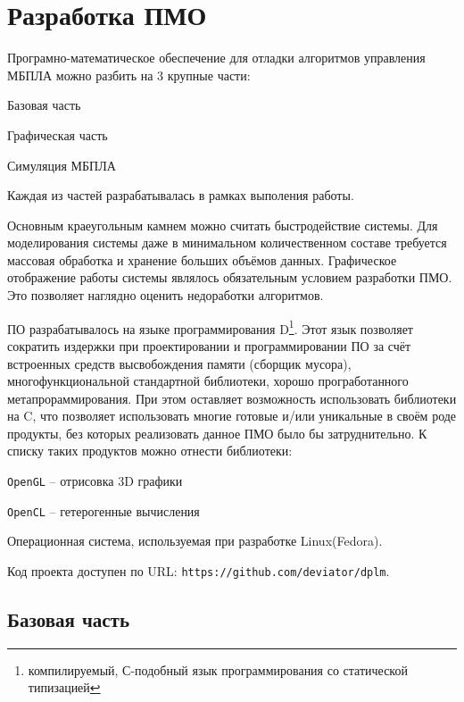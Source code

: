\section{Разработка ПМО}

Програмно-математическое обеспечение для отладки алгоритмов управления
\linebreak МБПЛА можно разбить на 3 крупные части:

\begin{mintemize}
\item Базовая часть
\item Графическая часть
\item Симуляция МБПЛА
\end{mintemize}

Каждая из частей разрабатывалась в рамках выполения работы.

Основным краеугольным камнем можно считать быстродействие системы.
Для моделирования системы даже в минимальном количественном составе
требуется массовая обработка и хранение больших объёмов данных. Графическое
отображение работы системы являлось обязательным условием разработки ПМО.
Это позволяет наглядно оценить недоработки алгоритмов.

ПО разрабатывалось на языке программирования D\footnote{компилируемый, С-подобный
язык программирования со статической типизацией}. Этот язык позволяет сократить
издержки при проектировании и программировании ПО за счёт встроенных средств
высвобождения памяти (сборщик мусора), многофункциональной стандартной
библиотеки, хорошо програботанного метапрораммирования. При этом оставляет
возможность использовать библиотеки на C, что позволяет использовать
многие готовые и/или уникальные в своём роде продукты, без которых
реализовать данное ПМО было бы затруднительно. К списку таких продуктов
можно отнести библиотеки:

\begin{mintemize}
\item \verb|OpenGL| -- отрисовка 3D графики
\item \verb|OpenCL| -- гетерогенные вычисления
\end{mintemize}

Операционная система, используемая при разработке Linux(Fedora).

Код проекта доступен по URL: \verb|https://github.com/deviator/dplm|.

\newpage
\subsection{Базовая часть}


